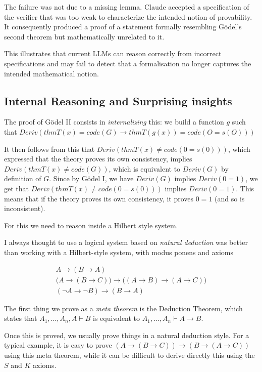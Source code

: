 \documentclass[11pt]{article}
\theoremstyle{plain}
\theoremstyle{definition}
\theoremstyle{remark}
\newcommand{\rta}{\rightarrow}
\begin{document}
The failure was not due to a missing lemma.
Claude accepted a specification of the verifier that was too weak to characterize the intended notion of provability.
It consequently produced a proof of a statement
formally resembling G\"odel's second theorem but mathematically unrelated to it.

This illustrates that current LLMs can reason correctly from incorrect specifications and may fail to detect that a formalisation
no longer captures the intended mathematical notion.

\subsection{Internal Reasoning and Surprising insights}

The proof of G\"odel II consists in {\em internalizing} this: we build a function $g$
such that $Deriv(thmT(x) = code(G) \rta thmT(g(x)) = code(O=s(O)))$

It then follows from this that $Deriv(thmT(x)\neq code(0=s(0)))$, which expressed that
the theory proves its own consistency, implies $Deriv(thmT(x)\neq code(G))$, which is equivalent
to $Deriv(G)$ by definition of $G$. Since by G\"odel I, we have $Deriv(G)$ implies $Deriv(0=1)$,
we get that $Deriv(thmT(x)\neq code(0=s(0)))$ implies $Deriv(0=1)$. This means that if the theory
proves its own consistency, it proves $0=1$ (and so is inconsistent).

For this we need to reason inside a Hilbert style system.

I always thought to use a logical system based on {\em natural deduction} was better than
working with a Hilbert-style system, with modus ponens and axioms 

\[
\begin{array}{l}
A \rta (B \rta A) \\[1ex]
\bigl(A \rta (B \rta C)\bigr)
\rta
\bigl((A \rta B) \rta (A \rta C)\bigr) \\[1ex]
(\neg A \rta \neg B) \rta (B \rta A)
\end{array}
\]

The first thing we prove as a {\em meta theorem} is the Deduction Theorem, which states that
$A_1,\dots,A_n,A\vdash B$ is equivalent to $A_1,\dots,A_n\vdash A\rta B$.

Once this is proved, we usually prove things in a natural deduction style.
For a typical example, it is easy to prove  $(A\rta (B\rta C))\rta (B\rta (A\rta C))$
using this meta theorem, while it can be difficult to derive directly this using the $S$ and $K$
axioms.
\end{document}
